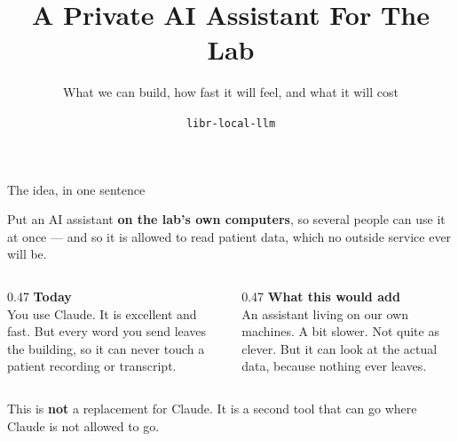 \documentclass[aspectratio=169]{beamer}
\title{A Private AI Assistant For The Lab}
\subtitle{What we can build, how fast it will feel, and what it will cost}
\author{\texttt{libr-local-llm}}
\date{}
\newcommand{\keybox}[1]{%
  \begin{center}
  \colorbox{black!8}{\parbox{0.92\textwidth}{\centering #1}}
  \end{center}}
\newcommand{\goodbox}[1]{%
  \begin{center}
  \colorbox{green!12}{\parbox{0.92\textwidth}{\centering #1}}
  \end{center}}
\begin{document}
\frame{\titlepage}

\begin{frame}{The idea, in one sentence}

\goodbox{\large Put an AI assistant \textbf{on the lab's own computers}, so several people can use
it at once --- and so it is allowed to read patient data, which no outside service ever will be.}

\vspace{1.0em}
\begin{columns}[T]
\begin{column}{0.47\textwidth}
{\large\textbf{Today}}\\[0.4em]
{\small You use Claude. It is excellent and fast. But every word you send leaves the building, so
it can never touch a patient recording or transcript.}
\end{column}
\begin{column}{0.47\textwidth}
{\large\textbf{What this would add}}\\[0.4em]
{\small An assistant living on our own machines. A bit slower. Not quite as clever. But it can look
at the actual data, because nothing ever leaves.}
\end{column}
\end{columns}

\vspace{1.0em}
\keybox{This is \textbf{not} a replacement for Claude. It is a second tool that can go where Claude
is not allowed to go.}

\end{frame}
\end{document}
